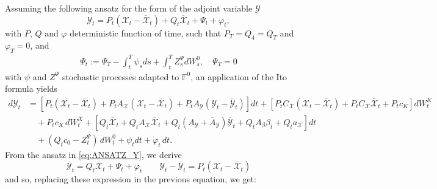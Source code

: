 \documentclass[10pt,a4paper]{amsart}
\numberwithin{equation}{section}
\begin{document}
Assuming the following ansatz for the form of the adjoint variable $\mathcal{Y}$
\begin{equation}\label{eq:ANSATZ_Y}
    {\mathcal{Y}}_t 
    = {P}_t ({\mathcal{X}}_t - \overline{{\mathcal{X}}}_t) + Q_t \overline{{\mathcal{X}}}_t +\Psi_t+ \varphi_t,
\end{equation}
with $P$, $Q$ and $\varphi$ deterministic function of time, such that $P_T=Q_4=Q_T$ and $\varphi_T=0$, and
\begin{align*}
    \Psi_t := \Psi_T-\int_t^T \psi_s ds + \int_t^T Z^\Psi_s dW^0_s,\quad \Psi_T = 0
\end{align*} 
with $\psi$ and $Z^\Psi$ stochastic processes adapted to $\mathbb{F}^0$, an application of the Ito formula yields
\begin{align*}
    d{\mathcal{Y}}_t 
    & = \left[ \dot{P}_t ({\mathcal{X}}_t - \overline{{\mathcal{X}}}_t) + {P}_t A_{\mathcal{X}} ({\mathcal{X}}_t - \overline{{\mathcal{X}}}_t) + {P}_t A_{\mathcal{Y}} ({\mathcal{Y}}_t - \overline{{\mathcal{Y}}}_t)\right]dt + \left[{P}_t C_{\mathcal{X}}({\mathcal{X}}_t - \overline{{\mathcal{X}}}_t) + {P}_t C_{\mathcal{X}} \overline{{\mathcal{X}}}_t +P_tc_K\right]dW_t^{K} \\
    & \quad + P_tc_X\,dW_t^{X} +\left[ \dot{Q}_t\overline{{\mathcal{X}}}_t + Q_t A_{\mathcal{X}} \overline{{\mathcal{X}}}_t + Q_t (A_{\mathcal{Y}} + \overline{A}_{\mathcal{Y}})\overline{{\mathcal{Y}}}_t + Q_t A_\beta \beta_t + Q_t a_\mathcal{X}\right]dt \\
    & \quad + (Q_t c_{0}-Z^\Psi_t)\,dW_t^{0} +\psi_t dt+ \dot{\varphi}_t\,dt.
\end{align*}
From the ansatz in \eqref{eq:ANSATZ_Y}, we derive 
\begin{equation}\label{eq:ansatz_cons}
    \overline{{\mathcal{Y}}}_t 
    = Q_t \overline{{\mathcal{X}}}_t + \Psi_t + \varphi_t
    \qquad 
    {\mathcal{Y}}_t - \overline{{\mathcal{Y}}}_t 
    = {P}_t({\mathcal{X}}_t - \overline{{\mathcal{X}}}_t)
\end{equation}
and so, replacing these expression in the previous equation, we get:
\end{document}
